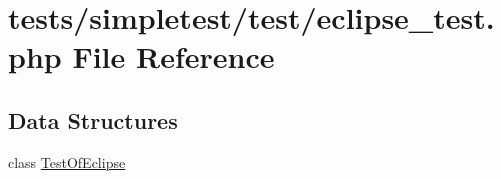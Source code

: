 \hypertarget{eclipse__test_8php}{\section{tests/simpletest/test/eclipse\-\_\-test.php File Reference}
\label{eclipse__test_8php}
}
\subsection*{Data Structures}
\begin{DoxyCompactItemize}
\item 
class \hyperlink{class_test_of_eclipse}{Test\-Of\-Eclipse}
\end{DoxyCompactItemize}
